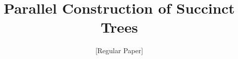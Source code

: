 \documentclass{sig-alternate}
\begin{document}
%

\title{Parallel Construction of Succinct Trees}
\subtitle{[Regular Paper]}
%
%
%
%
%
\end{document}
